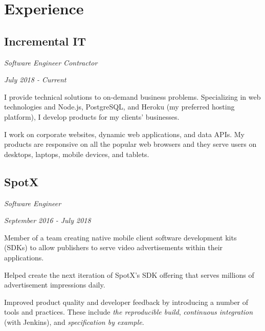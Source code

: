 \section*{Experience}

\setlength{\parindent}{0cm}
\setlength{\parskip}{0.5em}

\subsection*{Incremental IT}
\noindent\begin{minipage}[b]{0.5\textwidth}
  \flushleft
  \emph{Software Engineer Contractor}
\end{minipage}
\noindent\begin{minipage}[b]{0.5\textwidth}
  \flushright
  \emph{July 2018 - Current}
\end{minipage}

I provide technical solutions to on-demand business problems. Specializing in
web technologies and Node.js, PostgreSQL, and Heroku (my preferred hosting
platform), I develop products for my clients' businesses.

I work on corporate websites, dynamic web applications, and data APIs. My
products are responsive on all the popular web browsers and they serve users on
desktops, laptops, mobile devices, and tablets.

\subsection*{SpotX}
\noindent\begin{minipage}[b]{0.5\textwidth}
  \flushleft
  \emph{Software Engineer}
\end{minipage}
\noindent\begin{minipage}[b]{0.5\textwidth}
  \flushright
  \emph{September 2016 - July 2018}
\end{minipage}

Member of a team creating native mobile client software development kits (SDKs)
to allow publishers to serve video advertisements within their applications.

Helped create the next iteration of SpotX's SDK offering that serves millions of
advertisement impressions daily.

Improved product quality and developer feedback by introducing a number of tools
and practices. These include \emph{the reproducible build}, \emph{continuous
integration} (with Jenkins), and \emph{specification by example}.


